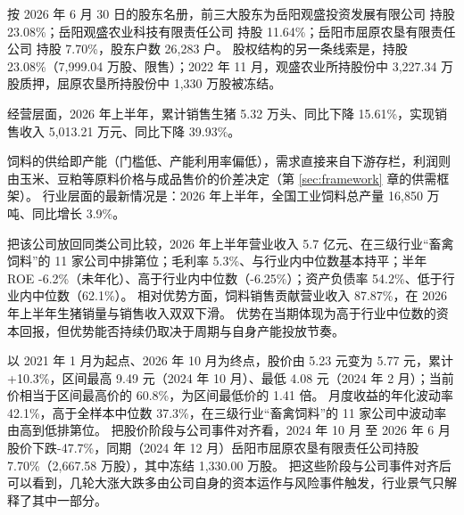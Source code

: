  按 2026 年 6 月 30 日的股东名册，前三大股东为岳阳观盛投资发展有限公司 持股 23.08\%；岳阳观盛农业科技有限责任公司 持股 11.64\%；岳阳市屈原农垦有限责任公司 持股 7.70\%，股东户数 26,283 户。 股权结构的另一条线索是，持股 23.08\%（7,999.04 万股、限售）；2022 年 11 月，观盛农业所持股份中 3,227.34 万股质押，屈原农垦所持股份中 1,330 万股被冻结。

 经营层面，2026 年上半年，累计销售生猪 5.32 万头、同比下降 15.61\%，实现销售收入 5,013.21 万元、同比下降 39.93\%。

 饲料的供给即产能（门槛低、产能利用率偏低），需求直接来自下游存栏，利润则由玉米、豆粕等原料价格与成品售价的价差决定（第 \ref{sec:framework} 章的供需框架）。 行业层面的最新情况是：2026 年上半年，全国工业饲料总产量 16,850 万吨、同比增长 3.9\%。

 把该公司放回同类公司比较，2026 年上半年营业收入 5.7 亿元、在三级行业“畜禽饲料”的 11 家公司中排第位；毛利率 5.3\%、与行业内中位数基本持平；半年 ROE -6.2\%（未年化）、高于行业内中位数（-6.25\%）；资产负债率 54.2\%、低于行业内中位数（62.1\%）。 相对优势方面，饲料销售贡献营业收入 87.87\%，在 2026 年上半年生猪销量与销售收入双双下滑。 优势在当期体现为高于行业中位数的资本回报，但优势能否持续仍取决于周期与自身产能投放节奏。

 以 2021 年 1 月为起点、2026 年 10 月为终点，股价由 5.23 元变为 5.77 元，累计 +10.3\%，区间最高 9.49 元（2024 年 10 月）、最低 4.08 元（2024 年 2 月）；当前价相当于区间最高价的 60.8\%，为区间最低价的 1.41 倍。 月度收益的年化波动率 42.1\%，高于全样本中位数 37.3\%，在三级行业“畜禽饲料”的 11 家公司中波动率由高到低排第位。 把股价阶段与公司事件对齐看，2024 年 10 月 至 2026 年 6 月股价下跌-47.7\%，同期（2024 年 12 月）岳阳市屈原农垦有限责任公司持股 7.70\%（2,667.58 万股），其中冻结 1,330.00 万股。 把这些阶段与公司事件对齐后可以看到，几轮大涨大跌多由公司自身的资本运作与风险事件触发，行业景气只解释了其中一部分。

